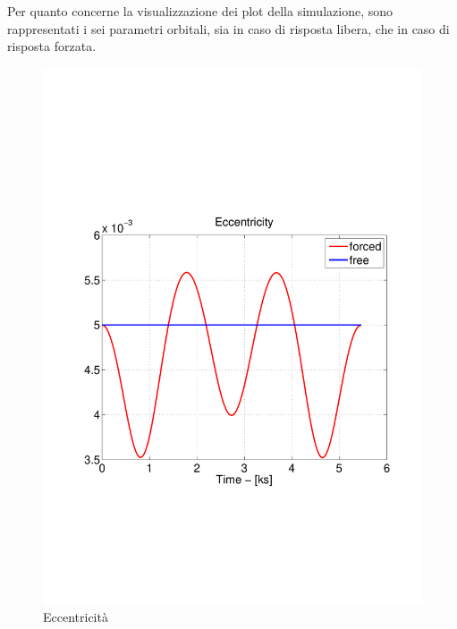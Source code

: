 Per quanto concerne la visualizzazione dei plot della simulazione, sono
rappresentati i sei parametri orbitali, sia in caso di risposta libera, che in
caso di risposta forzata.

\begin{figure}[h]
\begin{center}
  \includegraphics[width=\textwidth,clip=true,trim=1cm 6.5cm 1cm 8cm]
  {modelling/orbit_dynamics/image/eccentricity.pdf}
  \caption{Eccentricità}
\end{center}
\end{figure}

